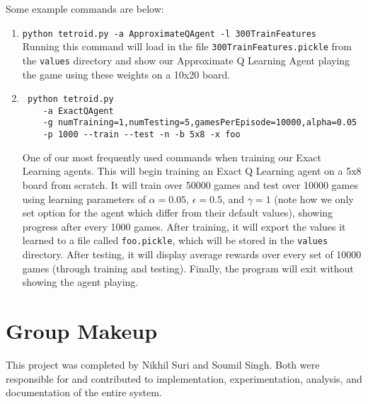 \documentclass[11pt]{article}
\begin{document}
Some example commands are below:
\begin{enumerate}
    \item \texttt{python tetroid.py -a ApproximateQAgent -l 300TrainFeatures}\\ Running this command will load in the file \texttt{300TrainFeatures.pickle} from the \texttt{values} directory and show our Approximate Q Learning Agent playing the game using these weights on a 10x20 board.
    \item \begin{verbatim} python tetroid.py
    -a ExactQAgent
    -g numTraining=1,numTesting=5,gamesPerEpisode=10000,alpha=0.05
    -p 1000 --train --test -n -b 5x8 -x foo
    \end{verbatim}
    One of our most frequently used commands when training our Exact Learning agents. This will begin training an Exact Q Learning agent on a 5x8 board from scratch. It will train over 50000 games and test over 10000 games using learning parameters of $\alpha=0.05$, $\epsilon=0.5$, and $\gamma=1$ (note how we only set option for the agent which differ from their default values), showing progress after every 1000 games. After training, it will export the values it learned to a file called \texttt{foo.pickle}, which will be stored in the \texttt{values} directory. After testing, it will display average rewards over every set of 10000 games (through training and testing). Finally, the program will exit without showing the agent playing.
\end{enumerate}

\section{Group Makeup}
This project was completed by Nikhil Suri and Soumil Singh. Both were responsible for and contributed to implementation, experimentation, analysis, and documentation of the entire system.



\end{document}
